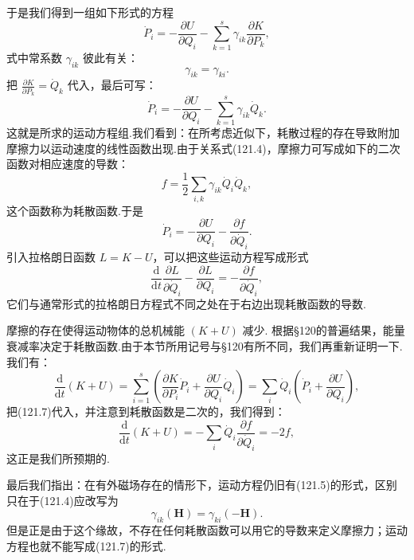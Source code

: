 于是我们得到一组如下形式的方程
\begin{equation*}
  \dot{P}_i=-\frac{\partial U}{\partial Q_i}
  -\sum_{k=1}^{s}\gamma_{ik}\frac{\partial K}{\partial P_k},
\end{equation*}
式中常系数 $\gamma_{ik}$ 彼此有关：
\begin{equation}
  \gamma_{ik}=\gamma_{ki}.
\end{equation}
把 $\frac{\partial K}{\partial P_k}=\dot{Q}_k$ 代入，最后可写：
\begin{equation}
  \dot{P}_i=-\frac{\partial U}{\partial Q_i}
  -\sum_{k=1}^{s}\gamma_{ik}\dot{Q}_k.
\end{equation}
这就是所求的运动方程组.我们看到：在所考虑近似下，耗散过程的存在导致附加摩擦力以运动速度的线性函数出现.由于关系式(121.4)，摩擦力可写成如下的二次函数对相应速度的导数：
\begin{equation}
  f=\frac{1}{2}\sum_{i,k}\gamma_{ik}\dot{Q}_i\dot{Q}_k,
\end{equation}
这个函数称为耗散函数.于是
\begin{equation}
  \dot{P}_i=-\frac{\partial U}{\partial Q_i}
  -\frac{\partial f}{\partial\dot{Q}_i}.
\end{equation}
引入拉格朗日函数 $L=K-U$，可以把这些运动方程写成形式
\begin{equation}
  \frac{\mathrm{d}}{\mathrm{d}t}\frac{\partial L}{\partial\dot{Q}_i}
  -\frac{\partial L}{\partial Q_i}
  =-\frac{\partial f}{\partial\dot{Q}_i},
\end{equation}
它们与通常形式的拉格朗日方程式不同之处在于右边出现耗散函数的导数.

摩擦的存在使得运动物体的总机械能 $(K+U)$ 减少. 根据§120的普遍结果，能量衰减率决定于耗散函数.由于本节所用记号与§120有所不同，我们再重新证明一下.我们有：
\begin{equation*}
  \frac{\mathrm{d}}{\mathrm{d}t}(K+U)
  =\sum_{i=1}^{s}\left(\frac{\partial K}{\partial P_i}\dot{P}_i
  +\frac{\partial U}{\partial Q_i}\dot{Q}_i\right)
  =\sum_i\dot{Q}_i\left(\dot{P}_i+\frac{\partial U}{\partial Q_i}\right),
\end{equation*}
把(121.7)代入，并注意到耗散函数是二次的，我们得到：
\begin{equation}
  \frac{\mathrm{d}}{\mathrm{d}t}(K+U)
  =-\sum_i\dot{Q}_i\frac{\partial f}{\partial\dot{Q}_i}=-2f,
\end{equation}
这正是我们所预期的.

最后我们指出：在有外磁场存在的情形下，运动方程仍旧有(121.5)的形式，区别只在于(121.4)应改写为
\begin{equation*}
  \gamma_{ik}(\boldsymbol{H})=\gamma_{ki}(-\boldsymbol{H}).
\end{equation*}
但是正是由于这个缘故，不存在任何耗散函数可以用它的导数来定义摩擦力；运动方程也就不能写成(121.7)的形式.

